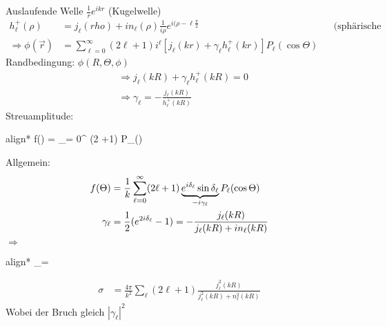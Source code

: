 	Auslaufende Welle $ %
	\frac{1}{r} e^{ikr}$ (Kugelwelle)
		\begin{align*}
			h_\ell^+ (\rho) &= j_\ell (rho) + in_\ell(\rho) %
			\frac{1}{i\rho} e^{i(\rho-\ell\frac{\pi}{2}} &
			&\text{(sphärische Hantelfunktion 1ter Art)} \\
			\Rightarrow \phi (\vec{r}) &= \sum_{\ell=0}^{\infty} (2 \ell +1) i^\ell
			\left[ j_\ell (kr) +\gamma_\ell h^+_\ell (kr)
			\right] P_\ell (\cos \Theta)
		\end{align*}
	Randbedingung: $\phi (R, \Theta, \phi)$
		\begin{align*}
			&\Rightarrow j_\ell (kR) + \gamma_\ell h_\ell^+(kR) = 0\\
			&\Rightarrow \gamma_\ell = -\frac{j_\ell(kR)}{h_\ell^+ (kR)}
		\end{align*}
	Streuamplitude:
		\begin{empheq}[box=\boxed]{align*}
			f(\Theta) = \sum_{\ell = 0}^{\infty} (2 \ell +1)  P_\ell(\cos \Theta)
		\end{empheq}
	Allgemein:
		\begin{align*}
			f(\Theta) &= \frac{1}{k} \sum_{\ell = 0}^{\infty}
			(2 \ell + 1) \underbrace{e^{i\delta_\ell} \sin \delta_\ell}_{\mathclap{-i \gamma_\ell}}
			P_\ell (\cos \Theta) \\
			\gamma_\ell &= \frac{1}{2} (e^{2i\delta_\ell} - 1)
			= -\frac{j_\ell(kR)}{j_\ell(kR)+ in_\ell (kR)}
		\end{align*}
		$\Rightarrow$
		\begin{empheq}[box=\boxed]{align*}
			\tan \delta_\ell = \frac{j_\ell (kR)}{n_\ell (kR)}
		\end{empheq}
		\begin{align*}
			\sigma &= \frac{4 \pi}{k^2} \sum_{\ell} (2\ell +1) 
			\frac{j_\ell^2 (kR)}{j_\ell^2 (kR)+ n_\ell^2 (kR)}
		\end{align*}
	Wobei der Bruch gleich $|\gamma_\ell|^2$
	
